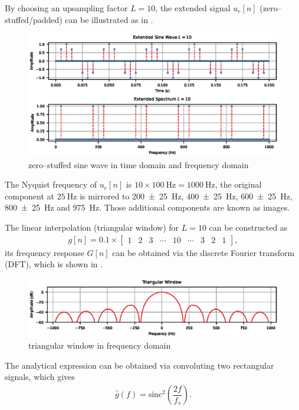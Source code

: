 By choosing an upsampling factor $L=10$, the extended signal $u_e[n]$ (zero--stuffed/padded) can be illustrated as in .
\begin{figure}[htb!]
\centering
\includegraphics{PIC/PureSineExtended}
\caption{zero--stuffed sine wave in time domain and frequency domain}\label{fig:extended}
\end{figure}
The Nyquist frequency of $u_e[n]$ is $10\times\SI{100}{\hertz}=\SI{1000}{\hertz}$, the original component at $\SI{25}{\hertz}$ is mirrored to \SI[separate-uncertainty=true]{200\pm25}{\hertz}, \SI[separate-uncertainty=true]{400\pm25}{\hertz}, \SI[separate-uncertainty=true]{600\pm25}{\hertz}, \SI[separate-uncertainty=true]{800\pm25}{\hertz} and \SI{975}{\hertz}. Those additional components are known as images.

The linear interpolation (triangular window) for $L=10$ can be constructed as
\begin{gather}
g[n]=0.1\times\begin{bmatrix}
1&2&3&\cdots&10&\cdots&3&2&1
\end{bmatrix},
\end{gather}
its frequency response $G[n]$ can be obtained via the discrete Fourier transform (DFT), which is shown in .
\begin{figure}[htb!]
\centering
\includegraphics{PIC/TriangularWindow}
\caption{triangular window in frequency domain}\label{fig:tri_window}
\end{figure}
The analytical expression can be obtained via convoluting two rectangular signals, which gives
\begin{gather}\label{eq:tri_kernel}
\hat{g}\left(f\right)=\text{sinc}^2\left(\dfrac{2f}{f_s}\right).
\end{gather}

